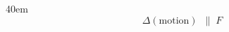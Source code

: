 \documentclass[border=8pt]{standalone}
\begin{document}
\begin{varwidth}{40em}
\LARGE\bfseries
\[ \Delta(\text{motion})\ \;\parallel\; F\ \]
\end{varwidth}
\end{document}
